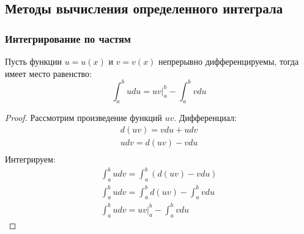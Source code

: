 \subsection{Методы вычисления определенного интеграла}

\subsubsection{Интегрирование по частям}

\begin{theorem}
  Пусть функции $u = u(x)$ и  $v = v(x)$ непрерывно дифференцируемы, тогда имеет место равенство:  \[
  \int_a^b u du = uv \bigg|_a^b - \int_a^b v du
  \] 
\end{theorem}
\begin{proof}
  Рассмотрим произведение функций $uv$. Дифференциал:
  \begin{gather*}
    d(uv) = v du + u dv \\
    u dv = d(uv) - v du \\
  \end{gather*}
  Интегрируем:
  \begin{gather*}
    \int_a^b u dv = \int_a^b (d(uv) - vdu) \\
    \int_a^b u dv = \int_a^b d(uv) - \int_a^b v du \\
    \int_a^b u dv = uv \bigg|_a^b - \int_a^b v du
  \end{gather*}
\end{proof}

